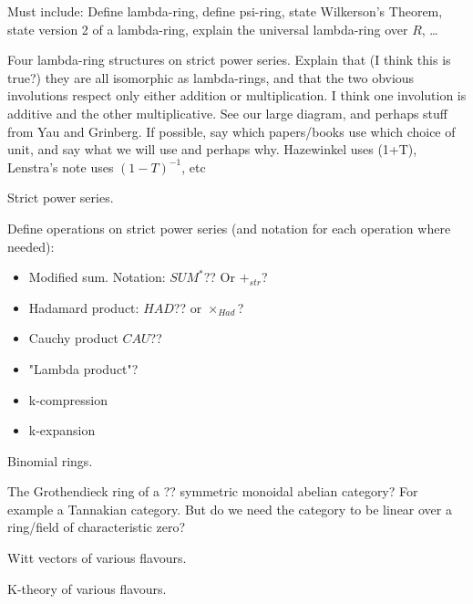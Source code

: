 \documentclass[a4paper]{article}
\begin{document}
Must include: Define lambda-ring, define psi-ring, state Wilkerson's Theorem, state version 2 of a lambda-ring, explain the universal lambda-ring over $R$, \ldots

\begin{example}
Four lambda-ring structures on strict power series. Explain that (I think this is true?) they are all isomorphic as lambda-rings, and that the two obvious involutions respect only either addition or multiplication. I think one involution is additive and the other multiplicative. See our large diagram, and perhaps stuff from Yau and Grinberg. If possible, say which papers/books use which choice of unit, and say what we will use and perhaps why. Hazewinkel uses (1+T), Lenstra's note uses $(1-T)^{-1}$, etc
\end{example}




\begin{definition}
\item Strict power series.
\end{definition}

Define operations on strict power series (and notation for each operation where needed):
\begin{itemize}
\item Modified sum. Notation: $SUM^{*}$?? Or $+_{str}$?
\item Hadamard product: $HAD$?? or $\times_{Had}$?
\item Cauchy product $CAU$?? 
\item "Lambda product"?
\item k-compression
\item k-expansion
\end{itemize}



\begin{example}
Binomial rings.
\end{example}

\begin{example}
The Grothendieck ring of a ?? symmetric monoidal abelian category? For example a Tannakian category. But do we need the category to be linear over a ring/field of characteristic zero?
\end{example}

\begin{example}
Witt vectors of various flavours.
\end{example}

\begin{example}
K-theory of various flavours.
\end{example}
\end{document}
